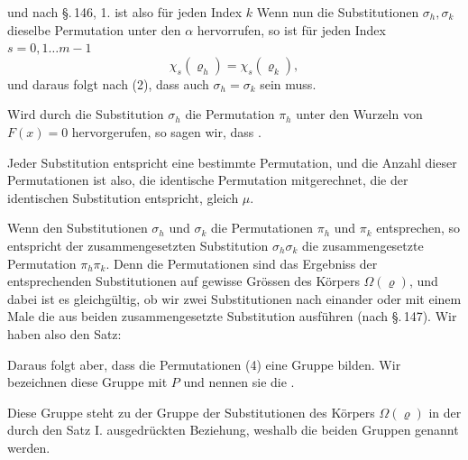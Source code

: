 
und nach \S.\,146, 1. ist also für jeden Index $k$
Wenn nun die Substitutionen $\sigma_h, \sigma_k$ dieselbe Permutation unter den $\alpha$ hervorrufen, so ist für jeden Index $s = 0, 1 \ldots m-1$
\[
\chi_s(\varrho_h) = \chi_s(\varrho_k),
\]
und daraus folgt nach (2), dass auch $\sigma_h = \sigma_k$ sein muss.

Wird durch die Substitution $\sigma_h$ die Permutation $\pi_h$ unter den Wurzeln von $F(x) = 0$ hervorgerufen, so sagen wir, dass .

Jeder Substitution entspricht eine bestimmte Permutation, und die Anzahl dieser Permutationen ist also, die identische Permutation mitgerechnet, die der identischen Substitution entspricht, gleich $\mu$.

Wenn den Substitutionen $\sigma_h$ und $\sigma_k$ die Permutationen $\pi_h$ und $\pi_k$ entsprechen, so entspricht der zusammengesetzten Substitution $\sigma_h \sigma_k$ die zusammengesetzte Permutation $\pi_h \pi_k$. Denn die Permutationen sind das Ergebniss der entsprechenden Substitutionen auf gewisse Grössen des Körpers $\Omega(\varrho)$, und dabei ist es gleichgültig, ob wir zwei Substitutionen nach einander oder mit einem Male die aus beiden zusammengesetzte Substitution ausführen (nach \S.\,147). Wir haben also den Satz:


Daraus folgt aber, dass die Permutationen (4) eine Gruppe bilden. Wir bezeichnen diese Gruppe mit $P$ und nennen sie die .

Diese Gruppe steht zu der Gruppe der Substitutionen des Körpers $\Omega(\varrho)$ in der durch den Satz I. ausgedrückten Beziehung, weshalb die beiden Gruppen  genannt werden.
